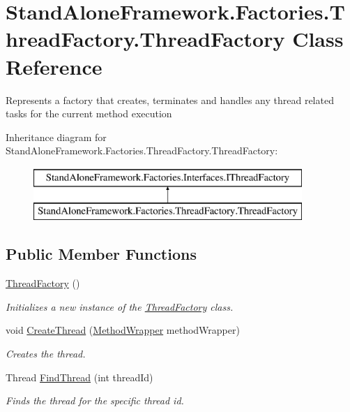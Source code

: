 \hypertarget{class_stand_alone_framework_1_1_factories_1_1_thread_factory_1_1_thread_factory}{\section{Stand\+Alone\+Framework.\+Factories.\+Thread\+Factory.\+Thread\+Factory Class Reference}
\label{class_stand_alone_framework_1_1_factories_1_1_thread_factory_1_1_thread_factory}
}


Represents a factory that creates, terminates and handles any thread related tasks for the current method execution  


Inheritance diagram for Stand\+Alone\+Framework.\+Factories.\+Thread\+Factory.\+Thread\+Factory\+:\begin{figure}[H]
\begin{center}
\leavevmode
\includegraphics[height=2.000000cm]{class_stand_alone_framework_1_1_factories_1_1_thread_factory_1_1_thread_factory}
\end{center}
\end{figure}
\subsection*{Public Member Functions}
\begin{DoxyCompactItemize}
\item 
\hyperlink{class_stand_alone_framework_1_1_factories_1_1_thread_factory_1_1_thread_factory_a3720d6bf9aa95133f38ac3d9f01b1e1b}{Thread\+Factory} ()
\begin{DoxyCompactList}\small\item\em Initializes a new instance of the \hyperlink{class_stand_alone_framework_1_1_factories_1_1_thread_factory_1_1_thread_factory}{Thread\+Factory} class. \end{DoxyCompactList}\item 
void \hyperlink{class_stand_alone_framework_1_1_factories_1_1_thread_factory_1_1_thread_factory_a4fb8eb961ebeb6acfbaab63f169a1cb8}{Create\+Thread} (\hyperlink{class_stand_alone_framework_1_1_factories_1_1_method_factory_1_1_method_wrapper}{Method\+Wrapper} method\+Wrapper)
\begin{DoxyCompactList}\small\item\em Creates the thread. \end{DoxyCompactList}\item 
Thread \hyperlink{class_stand_alone_framework_1_1_factories_1_1_thread_factory_1_1_thread_factory_a19b01caebe842de7e8ac8989319af582}{Find\+Thread} (int thread\+Id)
\begin{DoxyCompactList}\small\item\em Finds the thread for the specific thread id. \end{DoxyCompactList}\end{DoxyCompactItemize}
